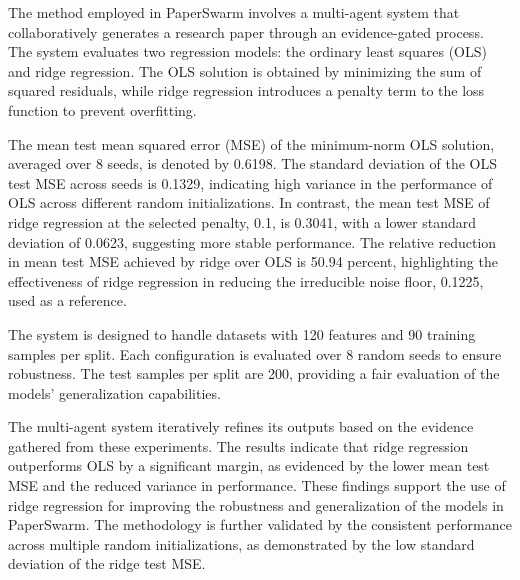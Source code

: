 The method employed in PaperSwarm involves a multi-agent system that collaboratively generates a research paper through an evidence-gated process. The system evaluates two regression models: the ordinary least squares (OLS) and ridge regression. The OLS solution is obtained by minimizing the sum of squared residuals, while ridge regression introduces a penalty term to the loss function to prevent overfitting.

The mean test mean squared error (MSE) of the minimum-norm OLS solution, averaged over 8 seeds, is denoted by 0.6198. The standard deviation of the OLS test MSE across seeds is 0.1329, indicating high variance in the performance of OLS across different random initializations. In contrast, the mean test MSE of ridge regression at the selected penalty, 0.1, is 0.3041, with a lower standard deviation of 0.0623, suggesting more stable performance. The relative reduction in mean test MSE achieved by ridge over OLS is 50.94 percent, highlighting the effectiveness of ridge regression in reducing the irreducible noise floor, 0.1225, used as a reference.

The system is designed to handle datasets with 120 features and 90 training samples per split. Each configuration is evaluated over 8 random seeds to ensure robustness. The test samples per split are 200, providing a fair evaluation of the models' generalization capabilities.

The multi-agent system iteratively refines its outputs based on the evidence gathered from these experiments. The results indicate that ridge regression outperforms OLS by a significant margin, as evidenced by the lower mean test MSE and the reduced variance in performance. These findings support the use of ridge regression for improving the robustness and generalization of the models in PaperSwarm. The methodology is further validated by the consistent performance across multiple random initializations, as demonstrated by the low standard deviation of the ridge test MSE.
